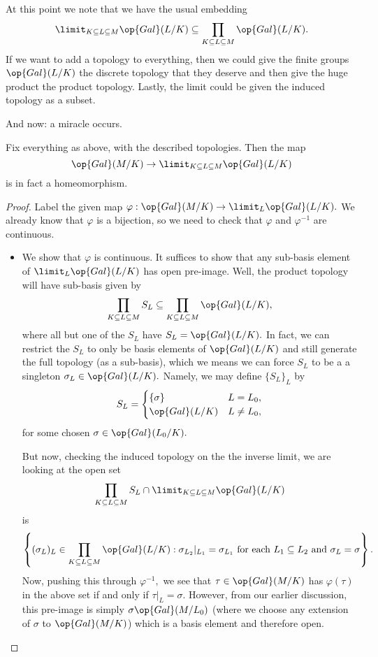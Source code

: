 At this point we note that we have the usual embedding
\[\limit_{K\subseteq L\subseteq M}\op{Gal}(L/K)\subseteq\prod_{K\subseteq L\subseteq M}\op{Gal}(L/K).\]
If we want to add a topology to everything, then we could give the finite groups $\op{Gal}(L/K)$ the discrete topology that they deserve and then give the huge product the product topology. Lastly, the limit could be given the induced topology as a subset.

And now: a miracle occurs.
\begin{theorem}
	Fix everything as above, with the described topologies. Then the map
	\[\op{Gal}(M/K)\to\limit_{K\subseteq L\subseteq M}\op{Gal}(L/K)\]
	is in fact a homeomorphism.
\end{theorem}
\begin{proof}
	Label the given map $\varphi:\op{Gal}(M/K)\to\limit_L\op{Gal}(L/K).$ We already know that $\varphi$ is a bijection, so we need to check that $\varphi$ and $\varphi^{-1}$ are continuous.
	\begin{itemize}
		\item We show that $\varphi$ is continuous. It suffices to show that any sub-basis element of $\limit_L\op{Gal}(L/K)$ has open pre-image. Well, the product topology will have sub-basis given by
		\[\prod_{K\subseteq L\subseteq M}S_L\subseteq\prod_{K\subseteq L\subseteq M}\op{Gal}(L/K),\]
		where all but one of the $S_L$ have $S_L=\op{Gal}(L/K).$ In fact, we can restrict the $S_L$ to only be basis elements of $\op{Gal}(L/K)$ and still generate the full topology (as a sub-basis), which we means we can force $S_L$ to be a a singleton $\sigma_L\in\op{Gal}(L/K).$ Namely, we may define $\{S_L\}_{L}$ by
		\[S_L=\begin{cases}
			\{\sigma\} & L=L_0, \\
			\op{Gal}(L/K) & L\ne L_0,
		\end{cases}\]
		for some chosen $\sigma\in\op{Gal}(L_0/K).$
		
		But now, checking the induced topology on the the inverse limit, we are looking at the open set
		\[\prod_{K\subseteq L\subseteq M}S_L\cap\limit_{K\subseteq L\subseteq M}\op{Gal}(L/K)\]
		is
		\[\left\{(\sigma_L)_L\in\prod_{K\subseteq L\subseteq M}\op{Gal}(L/K):\sigma_{L_2}|_{L_1}=\sigma_{L_1}\text{ for each }L_1\subseteq L_2\text{ and }\sigma_L=\sigma\right\}.\]
		Now, pushing this through $\varphi^{-1},$ we see that $\tau\in\op{Gal}(M/K)$ has $\varphi(\tau)$ in the above set if and only if $\tau|_L=\sigma.$ However, from our earlier discussion, this pre-image is simply $\sigma\op{Gal}(M/L_0)$ (where we choose any extension of $\sigma$ to $\op{Gal}(M/K)$) which is a basis element and therefore open.


\end{itemize}
\end{proof}
